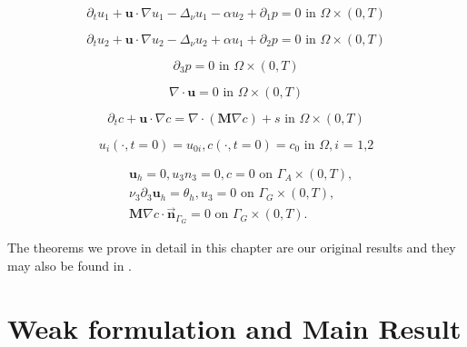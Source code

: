 \documentclass[12pt]{report}
\numberwithin{theorem}{chapter}
\numberwithin{corollary}{chapter}
\numberwithin{lemma}{chapter}
\numberwithin{remark}{chapter}
\numberwithin{definition}{chapter}
\numberwithin{prop}{chapter}
\begin{document}
\begin{equation} \label{HNSC1_coordinates_GFC}    
  \partial_t u_1 + \mathbf{u} \cdot \nabla u_1 - \Delta_\nu u_1 - \alpha u_2 + \partial_1 p = 0 \text{ in } \Omega \times (0,T)
\end{equation}

\begin{equation} \label{HNSC2_coordinates_GFC}   
  \partial_t u_2 + \mathbf{u} \cdot \nabla u_2 - \Delta_\nu u_2 + \alpha u_1 + \partial_2 p = 0 \text{ in } \Omega \times (0,T)
\end{equation}

\begin{equation} \label{HNSC3_coordinates_GFC}   
  \partial_3 p = 0 \text{ in } \Omega \times (0,T)
\end{equation}

\begin{equation} \label{HNSC4_coordinates_GFC}   
  \nabla \cdot \mathbf{u} = 0 \text{ in } \Omega \times (0,T)
\end{equation}

\begin{equation} \label{HNSC5_coordinates_GFC}
  \partial_t c + \mathbf{u} \cdot \nabla c = \nabla \cdot (\mathbf{M} \nabla c) + s \text{ in } \Omega \times (0,T)
\end{equation}

\begin{equation} \label{HNSC_init_coordinates_GFC}
  u_i (\cdot, t=0) = u_{0 i}, c (\cdot, t=0) = c_0 \text{ in } \Omega, \text{$i$ = 1,2}
\end{equation}

\begin{equation} \label{HNSC_bc_coordinates_GFC}
\begin{split}
& \mathbf{u}_h = 0, u_3 n_3 = 0, c = 0 \text{ on } \Gamma_A \times (0,T), \\
& \nu_3 \partial_3 \mathbf{u}_h = \theta_h, u_3 = 0 \text{ on } \Gamma_G \times (0,T), \\
& \mathbf{M} \nabla c \cdot \vec{\boldsymbol{n}}_{\Gamma_G} = 0 \text{ on } \Gamma_G \times (0,T).
\end{split}
\end{equation}

The theorems we prove in detail in this chapter are our original results and they may also be found in \cite{pollatmws2019}.

\section{Weak formulation and Main Result} \label{weakformulationmainresult_gfc}
\end{document}
